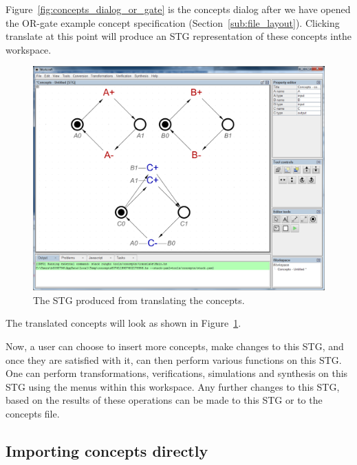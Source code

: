 \documentclass[british,conference,compsoc]{IEEEtran}
\begin{document}
Figure~\ref{fig:concepts_dialog_or_gate} is the concepts dialog after we have 
opened the OR-gate example concept specification 
(Section~\ref{sub:file_layout}). Clicking translate at this point will produce 
an STG representation of these concepts inthe workspace. 

\begin{figure}[H]
\begin{centering}
\includegraphics[scale=0.2]{Images/concepts_translated.png}
\par\end{centering}

\begin{centering}
\protect\caption{\label{fig:concepts_translated}The STG produced from 
			translating the concepts.}

\par\end{centering}

\end{figure}

The translated concepts will look as shown in 
Figure~\ref{fig:concepts_translated}.

Now, a user can choose to insert more concepts, make changes to this STG, and 
once they are satisfied with it, can then perform various functions on this STG.
One can perform transformations, verifications, simulations and synthesis on 
this STG using the menus within this workspace. Any further changes to this 
STG, based on the results of these operations can be made to this STG or to the
concepts file. 

\subsection{Importing concepts directly}
\end{document}
